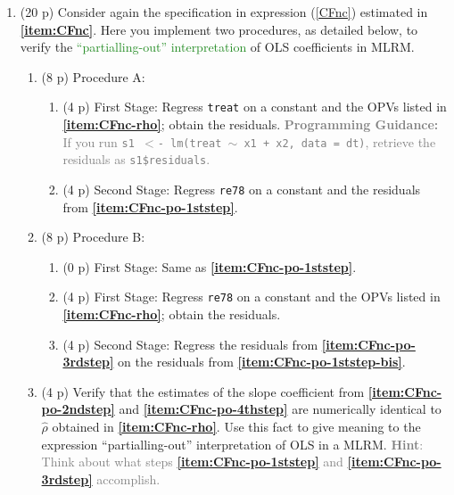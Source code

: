 \documentclass{article}
\begin{document}
\begin{enumerate}[label=\textbf{Q\arabic{enumi}}.,ref=Q\arabic{enumi}, wide=0pt, itemsep=0em, topsep=5pt, labelindent=0pt, resume]
\item (20 p) Consider again the specification in expression (\ref{CFnc}) estimated in \textbf{\textbf{\ref{item:CFnc}}}. Here you implement two procedures, as detailed below, to verify the \textcolor{ForestGreen}{``partialling-out'' interpretation} of OLS coefficients in MLRM.\label{item:CFnc-po}

\begin{enumerate}

\item (8 p) Procedure A:\label{item:CFnc-po-procA} 

\begin{enumerate}

\item (4 p) First Stage: Regress \texttt{treat} on a constant and the OPVs listed in \textbf{\ref{item:CFnc-rho}}; obtain the residuals. \textcolor{gray}{\textbf{Programming Guidance:} If you run \texttt{s1 $<$- lm(treat $\sim$ x1 + x2, data = dt)}, retrieve the residuals as \texttt{s1\$residuals}.}\label{item:CFnc-po-1ststep}  

\item (4 p) Second Stage: Regress \texttt{re78} on a constant and the residuals from \textbf{\ref{item:CFnc-po-1ststep}}.\label{item:CFnc-po-2ndstep}

\end{enumerate}

\item (8 p) Procedure B:\label{item:CFnc-po-procB}  

\begin{enumerate}
\item (0 p) First Stage: Same as \textbf{\ref{item:CFnc-po-1ststep}}.\label{item:CFnc-po-1ststep-bis}

\item (4 p) First Stage: Regress \texttt{re78} on a constant and the OPVs listed in \textbf{\textbf{\ref{item:CFnc-rho}}}; obtain the residuals.\label{item:CFnc-po-3rdstep}

\item (4 p) Second Stage: Regress the residuals from \textbf{\ref{item:CFnc-po-3rdstep}} on the residuals from \textbf{\ref{item:CFnc-po-1ststep-bis}}.\label{item:CFnc-po-4thstep}

\end{enumerate}

\item (4 p) Verify that the estimates of the slope coefficient from \textbf{\ref{item:CFnc-po-2ndstep}} and \textbf{\ref{item:CFnc-po-4thstep}} are numerically identical to $\hat{\rho}$ obtained in \textbf{\ref{item:CFnc-rho}}. Use this fact to give meaning to the expression ``partialling-out'' interpretation of OLS in a MLRM. \textcolor{gray}{\textbf{Hint}: Think about what steps \textbf{\ref{item:CFnc-po-1ststep}} and \textbf{\ref{item:CFnc-po-3rdstep}} accomplish.}


\end{enumerate}
\end{enumerate}
\end{document}
